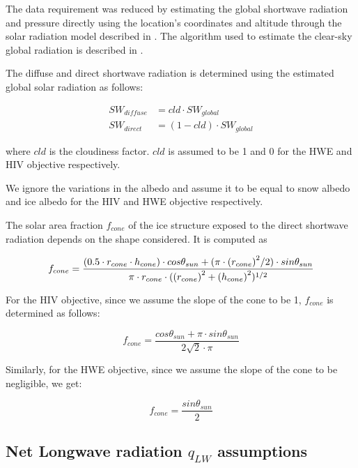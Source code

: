 \documentclass[tc, manuscript]{copernicus}
\begin{document}
The data requirement was reduced by estimating the global shortwave radiation and pressure directly using the
location's coordinates and altitude through the solar radiation model described in
\citet{holmgrenPvlibPythonPython2018}. The algorithm used to estimate the clear-sky global radiation is
described in \citet{ineichenBroadbandSimplifiedVersion2008}.  

The diffuse and direct shortwave radiation is determined using the estimated global solar radiation as follows:

\begin{equation}
\begin{split}
  SW_{diffuse} &= cld \cdot SW_{global}\\
  SW_{direct} &= (1-cld) \cdot SW_{global}
\end{split}
\end{equation}

where $cld$ is the cloudiness factor. $cld$ is assumed to be 1 and 0 for the HWE and HIV objective
respectively.

We ignore the variations in the albedo and assume it to be equal to snow albedo and ice albedo for the HIV and
HWE objective respectively.

The solar area fraction $f_{cone}$ of the ice structure exposed to the direct shortwave radiation depends on the
shape considered. It is computed as

\begin{equation}
		f_{cone} =\frac{(0.5 \cdot r_{cone} \cdot h_{cone}) \cdot cos \theta_{sun} +(\pi \cdot
			{(r_{cone})}^2/2) \cdot sin \theta_{sun} }{\pi \cdot r_{cone} \cdot ({(r_{cone})}^2+{(h_{cone})}^2)^{1/2}}\\
\end{equation}

For the HIV objective, since we assume the slope of the cone to be 1, $f_{cone}$ is determined as follows:

\begin{equation}
		f_{cone} =\frac{ cos \theta_{sun} + \pi \cdot sin \theta_{sun} }{2\sqrt{2} \cdot \pi }
\end{equation}

Similarly, for the HWE objective, since we assume the slope of the cone to be negligible, we get:

\begin{equation}
		f_{cone} =\frac{ sin \theta_{sun} }{2 }
\end{equation}

\subsection{Net Longwave radiation \texorpdfstring{$q_{LW}$}{Lg} assumptions} 
\end{document}
